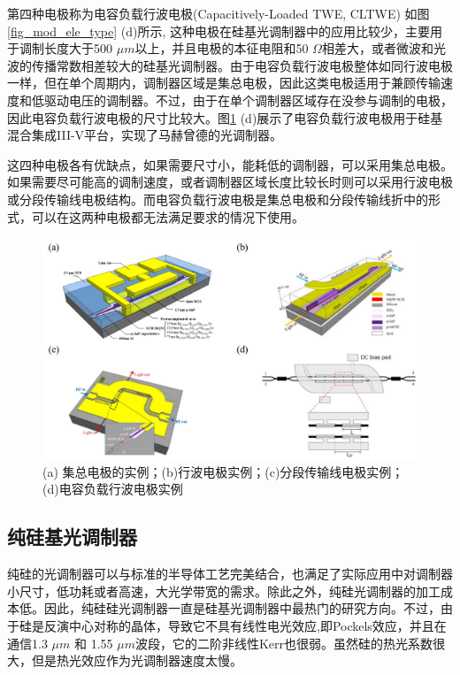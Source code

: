 第四种电极称为电容负载行波电极(Capacitively-Loaded TWE, CLTWE) 如图\ref{fig_mod_ele_type} (d)所示, 这种电极在硅基光调制器中的应用比较少，主要用于调制长度大于500 $\mu m$以上，并且电极的本征电阻和50 $\Omega$相差大，或者微波和光波的传播常数相差较大的硅基光调制器。由于电容负载行波电极整体如同行波电极一样，但在单个周期内，调制器区域是集总电极，因此这类电极适用于兼顾传输速度和低驱动电压的调制器。不过，由于在单个调制器区域存在没参与调制的电极，因此电容负载行波电极的尺寸比较大。图\ref{fig_mod_ele_type_real} (d)展示了电容负载行波电极用于硅基混合集成III-V平台\cite{tang2012energy}，实现了马赫曾德的光调制器。

这四种电极各有优缺点，如果需要尺寸小，能耗低的调制器，可以采用集总电极。如果需要尽可能高的调制速度，或者调制器区域长度比较长时则可以采用行波电极或分段传输线电极结构。而电容负载行波电极是集总电极和分段传输线折中的形式，可以在这两种电极都无法满足要求的情况下使用。
\begin{figure}[htb]
	\centering
	\includegraphics[width=12cm]{./Pictures/fig_mod_ele_type_real.jpg}
	\caption{ (a) 集总电极的实例\cite{tang2012energy}；(b)行波电极实例\cite{tang201150}；(c)分段传输线电极实例\cite{tang2012over}；(d)电容负载行波电极实例\cite{chen2011forty}}
	\label{fig_mod_ele_type_real}
\end{figure}
\subsection{纯硅基光调制器} \label{pure_simodulator}
纯硅的光调制器可以与标准的半导体工艺完美结合，也满足了实际应用中对调制器小尺寸，低功耗或者高速，大光学带宽的需求。除此之外，纯硅光调制器的加工成本低。因此，纯硅硅光调制器一直是硅基光调制器中最热门的研究方向。不过，由于硅是反演中心对称的晶体，导致它不具有线性电光效应,即Pockels效应，并且在通信1.3 $\mu m$ 和 1.55 $\mu m$波段，它的二阶非线性Kerr也很弱\cite{soref1987electrooptical}。虽然硅的热光系数很大，但是热光效应作为光调制器速度太慢\cite{cocorullo1992thermo}。

